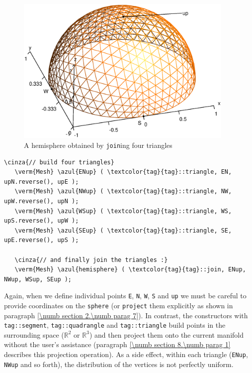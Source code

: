 \begin{figure}[ht] \centering
  \includegraphics[width=105mm]{hemisphere}
  \caption{A hemisphere obtained by {\small\tt join}ing four triangles}
\end{figure}

\begin{Verbatim}[commandchars=\\\{\},formatcom=\small\tt,frame=single,
   label=parag-\ref{\numb section 2.\numb parag 6}.cpp,rulecolor=\color{coment},
   baselinestretch=0.94,framesep=2mm                                            ]
   \cinza{// build four triangles}
   \verm{Mesh} \azul{ENup} ( \textcolor{tag}{tag}::triangle, EN, upN.reverse(), upE );
   \verm{Mesh} \azul{NWup} ( \textcolor{tag}{tag}::triangle, NW, upW.reverse(), upN );
   \verm{Mesh} \azul{WSup} ( \textcolor{tag}{tag}::triangle, WS, upS.reverse(), upW );
   \verm{Mesh} \azul{SEup} ( \textcolor{tag}{tag}::triangle, SE, upE.reverse(), upS );

   \cinza{// and finally join the triangles :}
   \verm{Mesh} \azul{hemisphere} ( \textcolor{tag}{tag}::join, ENup, NWup, WSup, SEup );
\end{Verbatim}

Again, when we define individual points {\small\tt E}, {\small\tt N}, {\small\tt W},
{\small\tt S} and {\small\tt up} we must be careful to provide coordinates on the
{\small\tt sphere} (or {\small\tt project} them explicitly as shown in paragraph
\ref{\numb section 2.\numb parag 7}).
In contrast, the {\small\tt {}} constructors with {\small\tt \textcolor{tag}{tag}::segment},
{\small\tt \textcolor{tag}{tag}::quadrangle} and {\small\tt \textcolor{tag}{tag}::triangle} build points in the
surrounding space ($ \mathbb{R}^2 $ or $ \mathbb{R}^3 $) and
then project them onto the current manifold without the user's assistance (paragraph
\ref{\numb section 8.\numb parag 1} describes this projection operation).
As a side effect, within each triangle ({\small\tt ENup}, {\small\tt NWup} and so forth),
the distribution of the vertices is not perfectly uniform.

